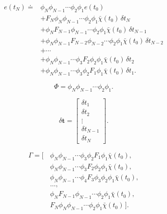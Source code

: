 \documentclass[12pt]{article}
\begin{document}
\begin{equation}
\begin{aligned}
    e(t_N)
    \doteq{}&
    \phi_N\phi_{N-1}\cdots\phi_2\phi_1e(t_0)                   \\
    &+F_N\phi_N\phi_{N-1}\cdots\phi_2\phi_1
      \bar\chi(t_0)\,\delta t_N                                 \\
    &+\phi_NF_{N-1}\phi_{N-1}\cdots\phi_2\phi_1
      \bar\chi(t_0)\,\delta t_{N-1}                            \\
    &+\phi_N\phi_{N-1}F_{N-2}\phi_{N-2}\cdots\phi_2\phi_1
      \bar\chi(t_0)\,\delta t_{N-2}                            \\
    &+\cdots                                                     \\
    &+\phi_N\phi_{N-1}\cdots\phi_3F_2\phi_2\phi_1
      \bar\chi(t_0)\,\delta t_2                                \\
    &+\phi_N\phi_{N-1}\cdots\phi_3\phi_2F_1\phi_1
      \bar\chi(t_0)\,\delta t_1.
\end{aligned}
\label{eq:error-after-cancellation}
\end{equation}

\begin{equation}
    \Phi
    =\phi_N\phi_{N-1}\cdots\phi_2\phi_1.
    \label{eq:Phi}
\end{equation}

\begin{equation}
    \delta\boldsymbol t=
    \begin{bmatrix}
        \delta t_1\\
        \delta t_2\\
        \vdots\\
        \delta t_{N-1}\\
        \delta t_N
    \end{bmatrix}.
    \label{eq:delta-t-vector}
\end{equation}

\begin{equation}
\begin{aligned}
    \Gamma=\bigl[\,&
    \phi_N\phi_{N-1}\cdots\phi_3\phi_2F_1\phi_1\bar\chi(t_0),
    \\[2pt]&
    \phi_N\phi_{N-1}\cdots\phi_3F_2\phi_2\phi_1\bar\chi(t_0),
    \\[2pt]&
    \phi_N\phi_{N-1}\cdots\phi_4F_3\phi_3\phi_2\phi_1
      \bar\chi(t_0),
    \\[2pt]&
    \ldots,
    \\[2pt]&
    \phi_NF_{N-1}\phi_{N-1}\cdots\phi_2\phi_1\bar\chi(t_0),
    \\[2pt]&
    F_N\phi_N\phi_{N-1}\cdots\phi_2\phi_1\bar\chi(t_0)
    \,\bigr].
\end{aligned}
\label{eq:Gamma}
\end{equation}
\end{document}
